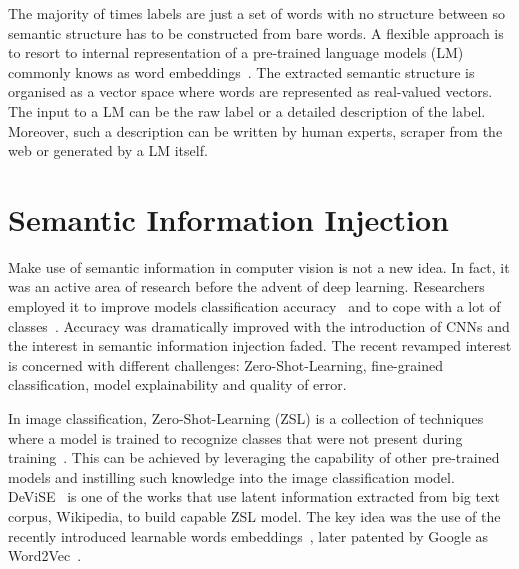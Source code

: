 The majority of times labels are just a set of words with no structure between
so semantic structure has to be constructed from bare words. A flexible
approach is to resort to internal representation of a pre-trained language
models (LM) commonly knows as word embeddings~\cite{BeyondWordEmbIncitt2023}.
The extracted semantic structure is organised as a vector space where words are
represented as real-valued vectors. The input to a LM can be the raw label or a
detailed description of the label. Moreover, such a description can be written
by human experts, scraper from the web or generated by a LM itself.

\section{Semantic Information Injection}
\label{sec:semantic-information-injection}


Make use of semantic information in computer vision is not a new idea. In fact,
it was an active area of research before the advent of deep learning.
Researchers employed it to improve models classification
accuracy~\cite{ScalableRecognNister2006, SemanticHierarMarsza2007,
ExploitingObjeZweig2007, LearningMultipKrizhe2009} and to cope with a lot of
classes~\cite{WhatDoesClassDeng2010}. Accuracy was dramatically improved with
the introduction of CNNs and the interest in semantic information injection
faded. The recent revamped interest is concerned with different challenges:
Zero-Shot-Learning, fine-grained classification, model explainability and
quality of error.

In image classification, Zero-Shot-Learning (ZSL) is a collection of techniques
where a model is trained to recognize classes that were not present during
training~\cite{AnIntroductionSoysal2020}. This can be achieved by leveraging
the capability of other pre-trained models and instilling such knowledge into
the image classification model. DeViSE~\cite{DeviseADeepFrome2013} is one of
the works that use latent information extracted from big text corpus, Wikipedia,
to build capable ZSL model. The key idea was the use of the recently introduced
learnable words embeddings~\cite{EfficientEstimMikolo2013,
DistributedRepMikolo2013}, later patented by Google as
Word2Vec~\cite{ComputingNumerMikolo2013}.




